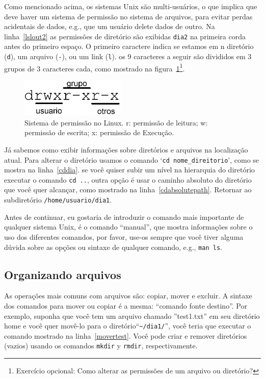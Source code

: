 \documentclass[letter,11pt]{book}
\begin{document}
Como mencionado acima, os sistemas Unix são multi-usuários, o que implica que deve haver um sistema de permissão no sistema de arquivos, para evitar perdas acidentais de dados, e.g., que um usuário delete dados de outro. Na linha~\ref{lslout2} as permissões de diretório são exibidas \Verb+dia2+ na primeira corda antes do primeiro espaço. O primeiro caractere indica se estamos em n diretório (\Verb+d+), um arquivo (\Verb+-+), ou um link (\Verb+l+). os 9 caracteres a seguir são divididos em 3 grupos de 3 caracteres cada, como mostrado na figura~\ref{permisos}\footnote{Exercício opcional: {\textquestiondown}Como alterar as permissões de um arquivo ou diretório?}.

\begin{figure}[ht]
\centering
   \includegraphics[width=5cm]{Figs/permisos.png}
  \caption[Sistema de permissão no Linux]{\label{permisos}Sistema de permissão no Linux. r: permissão de leitura; w: permissão de escrita; x: permissão de Execução.}
\end{figure}

Já sabemos como exibir informações sobre diretórios e arquivos na localização atual. Para alterar o diretório usamos o comando `\Verb+cd nome_direitorio+', como se mostra na linha~\ref{cddia}. se você quiser subir um nível na hierarquia do diretório executar o comando \Verb+cd ..+, outra opção é usar o caminho absoluto do diretório que você quer alcançar, como mostrado na linha~\ref{cdabsolutepath}. Retornar ao subdiretório \Verb+/home/usuario/dia1+.

Antes de continuar, eu gostaria de introduzir o comando mais importante de qualquer sistema Unix, é o comando ``manual'', que mostra informações sobre o uso dos diferentes comandos, por favor, use-os sempre que você tiver alguma dúvida sobre as opções ou sintaxe de qualquer comando, e.g., \Verb+man ls+.

\subsection{Organizando arquivos}

As operações mais comuns com arquivos são: copiar, mover e excluir. A sintaxe dos comandos para mover ou copiar é a mesma: ``comando fonte destino''. Por exemplo, suponha que você tem um arquivo chamado ''test1.txt'' em seu diretório home e você quer movê-lo para o diretório``\Verb+~/dia1/+'', você teria que executar o comando mostrado na linha~\ref{movertest}. Você pode criar e remover diretórios (vazios) usando os comandos \Verb+mkdir+ y \Verb+rmdir+, respectivamente.
\end{document}
